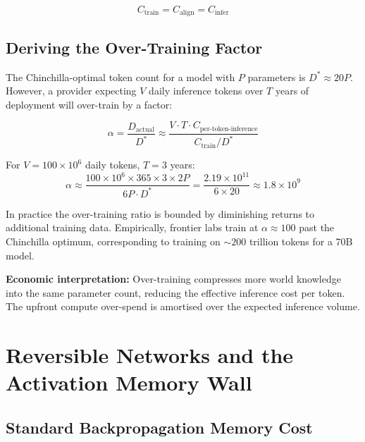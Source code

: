 \documentclass[11pt,a4paper]{article}
\begin{document}
\begin{equation}
  C_\text{train} = C_\text{align} = C_\text{infer}
  \label{eq:compute-balance}
\end{equation}

\subsection{Deriving the Over-Training Factor}

The Chinchilla-optimal \citep{hoffmann2022training} token count for a
model with $P$ parameters is $D^* \approx 20P$. However, a provider
expecting $V$ daily inference tokens over $T$ years of deployment will
over-train by a factor:

\begin{equation}
  \alpha = \frac{D_\text{actual}}{D^*}
         \approx \frac{V \cdot T \cdot C_\text{per-token-inference}}
                      {C_\text{train} / D^*}
  \label{eq:overtrain-factor}
\end{equation}

For $V = 100 \times 10^6$ daily tokens, $T = 3$ years:
\[
  \alpha \approx \frac{100 \times 10^6 \times 365 \times 3 \times 2P}
                      {6P \cdot D^*}
       = \frac{2.19 \times 10^{11}}{6 \times 20} \approx 1.8 \times 10^9
\]

In practice the over-training ratio is bounded by diminishing returns to
additional training data. Empirically, frontier labs train at
$\alpha \approx 100$ past the Chinchilla optimum, corresponding to training
on $\sim 200$ trillion tokens for a 70B model.

\textbf{Economic interpretation:} Over-training compresses more world
knowledge into the same parameter count, reducing the effective inference
cost per token. The upfront compute over-spend is amortised over the
expected inference volume.

\section{Reversible Networks and the Activation Memory Wall}
\label{sec:revnet}

\subsection{Standard Backpropagation Memory Cost}
\end{document}
